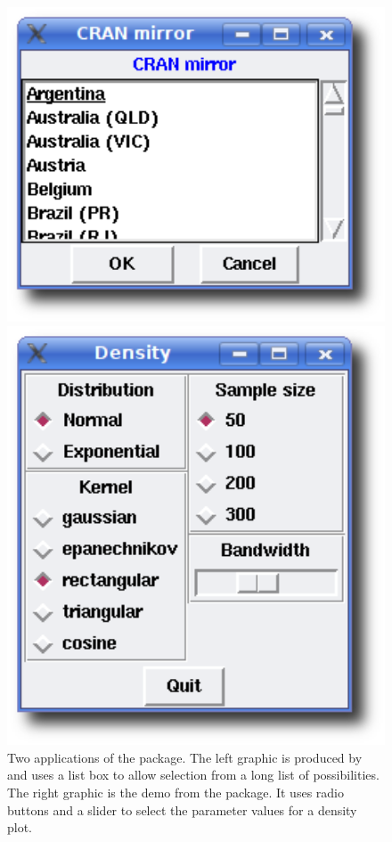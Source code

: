 \begin{figure}
  \centering
  \begin{minipage}[c]{.45\linewidth}
    \includegraphics[width=1\textwidth]{ex-listbox}
  \end{minipage}
  \begin{minipage}[c]{.45\linewidth}
    \includegraphics[width=1\textwidth]{tcltk-tkdensity}    
  \end{minipage}
 \caption{
    Two applications of the  package. 
    The left graphic is
    produced by  and uses a list box to
    allow selection from a long list of possibilities.
    The right graphic is the  demo from the 
    package. It uses radio buttons and a slider to select the
    parameter values for a density plot.
  }
  \label{fig:GUI:ex-tcltk}
\end{figure}

